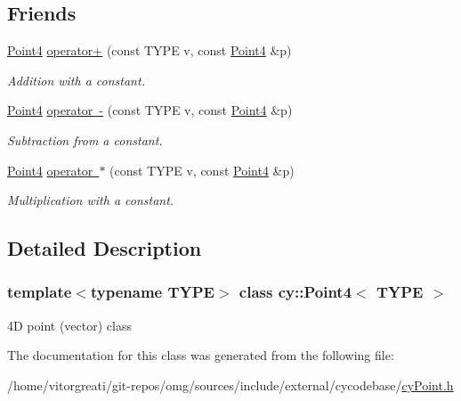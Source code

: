 \subsection*{Friends}
\begin{DoxyCompactItemize}
\item 
\mbox{\label{classcy_1_1_point4_a46a904672e82ebf31ba3543b2aa4e9a1}} 
\mbox{\hyperlink{classcy_1_1_point4}{Point4}} \mbox{\hyperlink{classcy_1_1_point4_a46a904672e82ebf31ba3543b2aa4e9a1}{operator+}} (const T\+Y\+PE v, const \mbox{\hyperlink{classcy_1_1_point4}{Point4}} \&p)
\begin{DoxyCompactList}\small\item\em Addition with a constant. \end{DoxyCompactList}\item 
\mbox{\label{classcy_1_1_point4_a3498366f6bf113f68ad623023e092ffc}} 
\mbox{\hyperlink{classcy_1_1_point4}{Point4}} \mbox{\hyperlink{classcy_1_1_point4_a3498366f6bf113f68ad623023e092ffc}{operator -\/}} (const T\+Y\+PE v, const \mbox{\hyperlink{classcy_1_1_point4}{Point4}} \&p)
\begin{DoxyCompactList}\small\item\em Subtraction from a constant. \end{DoxyCompactList}\item 
\mbox{\label{classcy_1_1_point4_affde1fba0200ea1723a3c44eb77706a0}} 
\mbox{\hyperlink{classcy_1_1_point4}{Point4}} \mbox{\hyperlink{classcy_1_1_point4_affde1fba0200ea1723a3c44eb77706a0}{operator $\ast$}} (const T\+Y\+PE v, const \mbox{\hyperlink{classcy_1_1_point4}{Point4}} \&p)
\begin{DoxyCompactList}\small\item\em Multiplication with a constant. \end{DoxyCompactList}\end{DoxyCompactItemize}


\subsection{Detailed Description}
\subsubsection*{template$<$typename T\+Y\+PE$>$\newline
class cy\+::\+Point4$<$ T\+Y\+P\+E $>$}

4D point (vector) class 

The documentation for this class was generated from the following file\+:\begin{DoxyCompactItemize}
\item 
/home/vitorgreati/git-\/repos/omg/sources/include/external/cycodebase/\mbox{\hyperlink{cy_point_8h}{cy\+Point.\+h}}\end{DoxyCompactItemize}
